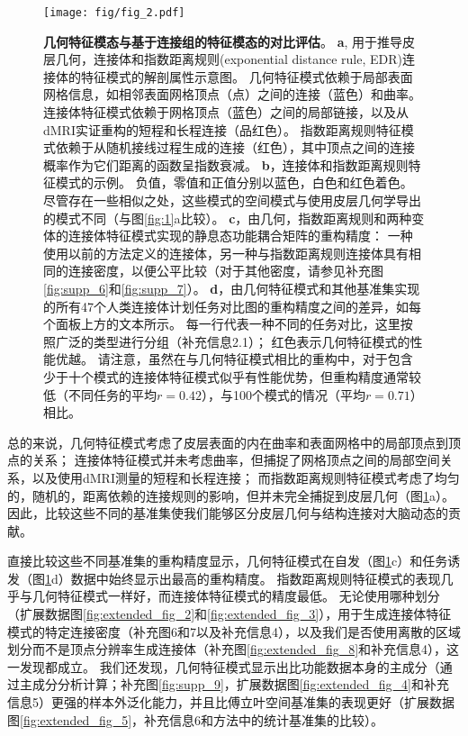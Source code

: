 \documentclass[lang=cn,a4paper,newtx]{elegantpaper}
\begin{document}
\begin{figure}[!htb]
	\centering
	\texttt{[image: fig/fig\_2.pdf]}
	\caption{\textbf{几何特征模态与基于连接组的特征模态的对比评估}。
		\textbf{a}, 用于推导皮层几何，连接体和指数距离规则(exponential distance rule, EDR)连接体的特征模式的解剖属性示意图。
		几何特征模式依赖于局部表面网格信息，如相邻表面网格顶点（点）之间的连接（蓝色）和曲率。
		连接体特征模式依赖于网格顶点（蓝色）之间的局部链接，以及从dMRI实证重构的短程和长程连接（品红色）。
		指数距离规则特征模式依赖于从随机接线过程生成的连接（红色），其中顶点之间的连接概率作为它们距离的函数呈指数衰减。
		\textbf{b}，连接体和指数距离规则特征模式的示例。
		负值，零值和正值分别以蓝色，白色和红色着色。
		尽管存在一些相似之处，这些模式的空间模式与使用皮层几何学导出的模式不同（与图\ref{fig:1}a比较）。
		\textbf{c}，由几何，指数距离规则和两种变体的连接体特征模式实现的静息态功能耦合矩阵的重构精度：
		一种使用以前的方法\cite{naze2021robustness}定义的连接体，另一种与指数距离规则连接体具有相同的连接密度，以便公平比较（对于其他密度，请参见补充图\ref{fig:supp_6}和\ref{fig:supp_7}）。
		\textbf{d}，由几何特征模式和其他基准集实现的所有47个人类连接体计划任务对比图的重构精度之间的差异，如每个面板上方的文本所示。
		每一行代表一种不同的任务对比，这里按照广泛的类型进行分组（补充信息2.1）；
		红色表示几何特征模式的性能优越。
		请注意，虽然在与几何特征模式相比的重构中，对于包含少于十个模式的连接体特征模式似乎有性能优势，但重构精度通常较低（不同任务的平均$ r = 0.42 $），与100个模式的情况（平均$ r = 0.71 $）相比。
	} \label{fig:2}
\end{figure}


总的来说，几何特征模式考虑了皮层表面的内在曲率和表面网格中的局部顶点到顶点的关系；
连接体特征模式并未考虑曲率，但捕捉了网格顶点之间的局部空间关系，以及使用dMRI测量的短程和长程连接；
而指数距离规则特征模式考虑了均匀的，随机的，距离依赖的连接规则的影响，但并未完全捕捉到皮层几何（图\ref{fig:2}a）。
因此，比较这些不同的基准集使我们能够区分皮层几何与结构连接对大脑动态的贡献。


直接比较这些不同基准集的重构精度显示，几何特征模式在自发（图\ref{fig:2}c）和任务诱发（图\ref{fig:2}d）数据中始终显示出最高的重构精度。
指数距离规则特征模式的表现几乎与几何特征模式一样好，而连接体特征模式的精度最低。
无论使用哪种划分（扩展数据图\ref{fig:extended_fig_2}和\ref{fig:extended_fig_3}），用于生成连接体特征模式的特定连接密度（补充图6和7以及补充信息4），以及我们是否使用离散的区域划分而不是顶点分辨率生成连接体（补充图\ref{fig:extended_fig_8}和补充信息4），这一发现都成立。
我们还发现，几何特征模式显示出比功能数据本身的主成分（通过主成分分析计算；补充图\ref{fig:supp_9}，扩展数据图\ref{fig:extended_fig_4}和补充信息5）更强的样本外泛化能力，并且比傅立叶空间基准集的表现更好（扩展数据图\ref{fig:extended_fig_5}，补充信息6和方法中的统计基准集的比较）。
\end{document}
